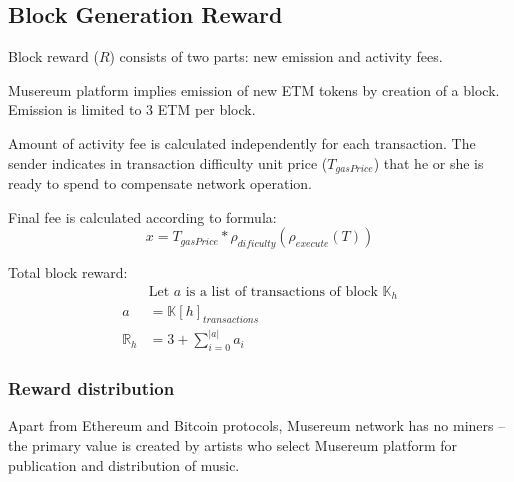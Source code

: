 \documentclass[12pt]{report}
\begin{document}
\begin{figure}[H]
\end{figure}

\subsection{Block Generation Reward}
\label{tech-blockchain-reward}
Block reward ($R$) consists of two parts: new emission and activity fees.

Musereum platform implies emission of new ETM tokens by creation of a block. Emission is limited to 3 ETM per block.

Amount of activity fee is calculated independently for each transaction. The sender indicates in transaction difficulty unit price ($T_{gasPrice}$) that he or she is ready to spend to compensate network operation.

Final 	fee is calculated according to formula:
\begin{equation}
x = T_{gasPrice} * \rho_{dificulty}(\rho_{execute}(T))
\end{equation}

Total block reward:
\begin{align}
&\text{Let } a \text{ is a list of transactions of block } \mathbb{K}_h \\
a &= \mathbb{K}[h]_{transactions} \\
\mathbb{R}_h &= 3 + \sum\limits_{i=0}^{|a|} a_i
\end{align}

\subsubsection{Reward distribution}
\label{tech-blockchain-reward-distribution}
Apart from Ethereum and Bitcoin protocols, Musereum network has no miners – the primary value is created by artists who select Musereum platform for publication and distribution of music.
\end{document}
